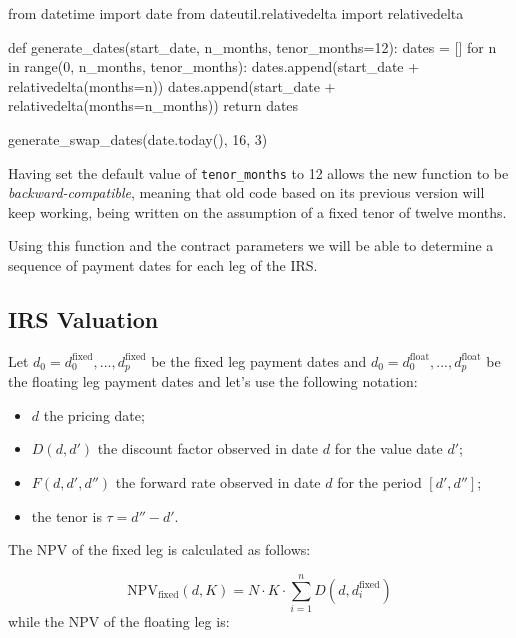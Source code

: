 \begin{ipython}
from datetime import date
from dateutil.relativedelta import relativedelta

def generate_dates(start_date, n_months, tenor_months=12):
    dates = []
    for n in range(0, n_months, tenor_months):
        dates.append(start_date + relativedelta(months=n))
    dates.append(start_date + relativedelta(months=n_months))
    return dates
    
generate_swap_dates(date.today(), 16, 3)
\end{ipython}
\begin{ioutput}
\end{ioutput}
Having set the default value of \texttt{tenor\_months} to 12 allows the new function to be \emph{backward-compatible}, meaning that old code based on its previous version will keep working, being written on the assumption of a fixed tenor of twelve months. 
       
Using this function and the contract parameters we will be able to determine a sequence of payment dates for each leg of the IRS.

\subsection{IRS Valuation}
\label{irs-valuation}

Let \(d_0=d_0^{\mathrm{fixed}},...,d_p^{\mathrm{fixed}}\) be the fixed leg payment dates and \(d_0=d_0^{\mathrm{float}},...,d_p^{\mathrm{float}}\) be the floating leg payment dates and let's use the following notation:

\begin{itemize}
\tightlist
\item
  \(d\) the pricing date;
\item
  \(D(d, d')\) the discount factor observed in date \(d\) for the value date \(d'\);
\item
  \(F(d, d', d'')\) the forward rate observed in date \(d\) for the period \([d', d'']\); 
  \item the tenor is \(\tau = d'' - d'\).
\end{itemize}
The NPV of the fixed leg is calculated as follows:

\begin{equation}
\mathrm{NPV}_{\mathrm{fixed}}(d, K) = N\cdot K\cdot\sum_{i=1}^{n}D(d, d_{i}^{\mathrm{fixed}})\end{equation}
while the NPV of the floating leg is:

